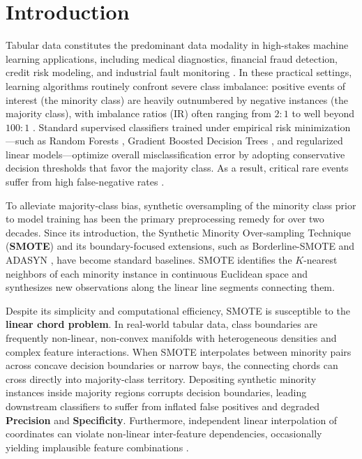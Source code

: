 \documentclass[sn-basic]{sn-jnl}
\begin{document}
\maketitle

\section{Introduction}
\label{sec:introduction}

Tabular data constitutes the predominant data modality in high-stakes machine learning applications, including medical diagnostics, financial fraud detection, credit risk modeling, and industrial fault monitoring \citep{shwartz2022tabular, grinsztajn2022tree}. In these practical settings, learning algorithms routinely confront severe class imbalance: positive events of interest (the minority class) are heavily outnumbered by negative instances (the majority class), with imbalance ratios ($\text{IR}$) often ranging from $2:1$ to well beyond $100:1$ \citep{le2022survey}. Standard supervised classifiers trained under empirical risk minimization---such as Random Forests \citep{breiman2001random}, Gradient Boosted Decision Trees \citep{chen2016xgboost, ke2017lightgbm}, and regularized linear models---optimize overall misclassification error by adopting conservative decision thresholds that favor the majority class. As a result, critical rare events suffer from high false-negative rates \citep{chawla2002smote}.

To alleviate majority-class bias, synthetic oversampling of the minority class prior to model training has been the primary preprocessing remedy for over two decades. Since its introduction, the Synthetic Minority Over-sampling Technique (\textbf{SMOTE}) \citep{chawla2002smote} and its boundary-focused extensions, such as Borderline-SMOTE \citep{han2005borderline} and ADASYN \citep{he2008adasyn}, have become standard baselines. SMOTE identifies the $K$-nearest neighbors of each minority instance in continuous Euclidean space and synthesizes new observations along the linear line segments connecting them.

Despite its simplicity and computational efficiency, SMOTE is susceptible to the \textbf{linear chord problem}. In real-world tabular data, class boundaries are frequently non-linear, non-convex manifolds with heterogeneous densities and complex feature interactions. When SMOTE interpolates between minority pairs across concave decision boundaries or narrow bays, the connecting chords can cross directly into majority-class territory. Depositing synthetic minority instances inside majority regions corrupts decision boundaries, leading downstream classifiers to suffer from inflated false positives and degraded \textbf{Precision} and \textbf{Specificity}. Furthermore, independent linear interpolation of coordinates can violate non-linear inter-feature dependencies, occasionally yielding implausible feature combinations \citep{dinsdale2021deepsmote}.
\end{document}
